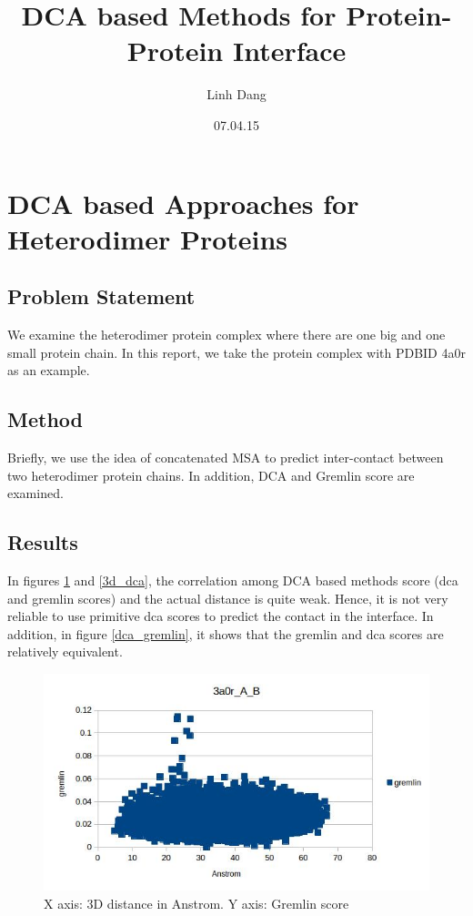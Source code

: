 \documentclass[a4paper,12pt]{article}
\begin{document}
\title{DCA based Methods for Protein-Protein Interface}
\author{Linh Dang}
\date{07.04.15} 
\maketitle

\section*{DCA based Approaches for Heterodimer Proteins}
\subsection*{Problem Statement}
We examine the heterodimer protein complex where there are one big and one small protein chain. In this report, we take the protein complex with PDBID 4a0r as an example. 
\subsection*{Method}
Briefly, we use the idea of concatenated MSA to predict inter-contact between two heterodimer protein chains. In addition, DCA and Gremlin score are examined. 
\subsection*{Results}
In figures \ref{3d_gremlin} and \ref{3d_dca}, the correlation among DCA based methods score (dca and gremlin scores) and the actual distance is quite weak. Hence, it is not very reliable to use primitive dca scores to predict the contact in the interface. 
In addition, in figure \ref{dca_gremlin}, it shows that the gremlin and dca scores are relatively equivalent. 

\begin{figure}
\includegraphics[scale=0.4]{3a0r_AB_3d_gremlin.jpg}
\caption{X axis: 3D distance in Anstrom. Y axis: Gremlin score}
\label{3d_gremlin}
\end{figure}
\end{document}
